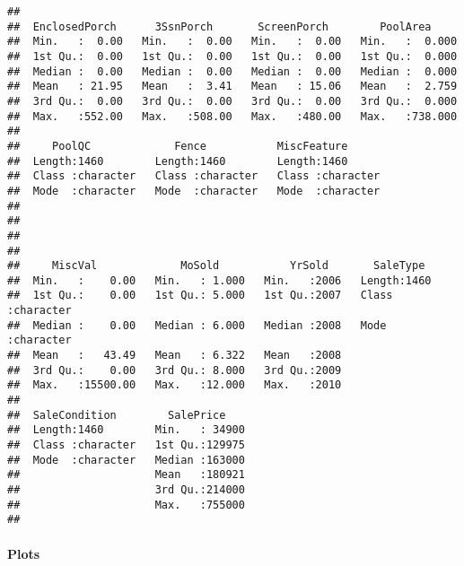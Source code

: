 \documentclass[]{article}
\newenvironment{Shaded}{\begin{snugshade}}{\end{snugshade}}
\newcommand{\DataTypeTok}[1]{\textcolor[rgb]{0.13,0.29,0.53}{#1}}
\newcommand{\KeywordTok}[1]{\textcolor[rgb]{0.13,0.29,0.53}{\textbf{#1}}}
\newcommand{\NormalTok}[1]{#1}
\newcommand{\OperatorTok}[1]{\textcolor[rgb]{0.81,0.36,0.00}{\textbf{#1}}}
\newcommand{\StringTok}[1]{\textcolor[rgb]{0.31,0.60,0.02}{#1}}
\let\oldparagraph\paragraph
\renewcommand{\paragraph}[1]{\oldparagraph{#1}\mbox{}}
\begin{document}
\begin{verbatim}
##                                                                         
##  EnclosedPorch      3SsnPorch       ScreenPorch        PoolArea      
##  Min.   :  0.00   Min.   :  0.00   Min.   :  0.00   Min.   :  0.000  
##  1st Qu.:  0.00   1st Qu.:  0.00   1st Qu.:  0.00   1st Qu.:  0.000  
##  Median :  0.00   Median :  0.00   Median :  0.00   Median :  0.000  
##  Mean   : 21.95   Mean   :  3.41   Mean   : 15.06   Mean   :  2.759  
##  3rd Qu.:  0.00   3rd Qu.:  0.00   3rd Qu.:  0.00   3rd Qu.:  0.000  
##  Max.   :552.00   Max.   :508.00   Max.   :480.00   Max.   :738.000  
##                                                                      
##     PoolQC             Fence           MiscFeature       
##  Length:1460        Length:1460        Length:1460       
##  Class :character   Class :character   Class :character  
##  Mode  :character   Mode  :character   Mode  :character  
##                                                          
##                                                          
##                                                          
##                                                          
##     MiscVal             MoSold           YrSold       SaleType        
##  Min.   :    0.00   Min.   : 1.000   Min.   :2006   Length:1460       
##  1st Qu.:    0.00   1st Qu.: 5.000   1st Qu.:2007   Class :character  
##  Median :    0.00   Median : 6.000   Median :2008   Mode  :character  
##  Mean   :   43.49   Mean   : 6.322   Mean   :2008                     
##  3rd Qu.:    0.00   3rd Qu.: 8.000   3rd Qu.:2009                     
##  Max.   :15500.00   Max.   :12.000   Max.   :2010                     
##                                                                       
##  SaleCondition        SalePrice     
##  Length:1460        Min.   : 34900  
##  Class :character   1st Qu.:129975  
##  Mode  :character   Median :163000  
##                     Mean   :180921  
##                     3rd Qu.:214000  
##                     Max.   :755000  
## 
\end{verbatim}

\hypertarget{plots}{%
\paragraph{Plots}\label{plots}}

\begin{Shaded}
\end{Shaded}
\end{document}
